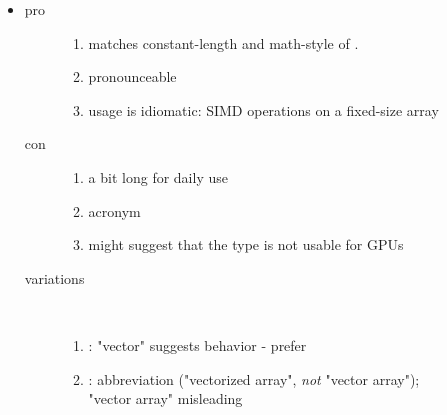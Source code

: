 \begin{itemize}
  \item {}
    \begin{description}
      \item[pro]
        \begin{enumerate}
          \item matches constant-length  and math-style of .
          \item pronounceable
          \item usage is idiomatic: SIMD operations on a fixed-size array
        \end{enumerate}
      \item[con]
        \begin{enumerate}
          \item a bit long for daily use
          \item acronym
          \item might suggest that the type is not usable for GPUs
        \end{enumerate}
      \item[variations]\ 
        \begin{enumerate}
          \item {}: "vector" suggests  behavior - prefer 
          \item \code{vecarray<T>}: abbreviation ("vectorized array", \emph{not} "vector array");\\
            "vector array" misleading
        \end{enumerate}
    \end{description}


\end{itemize}
